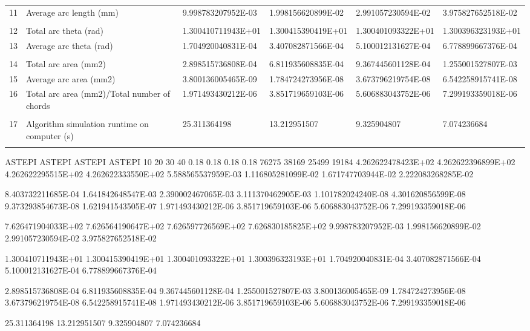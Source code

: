 \begin{tabular}{ p{0.5cm} p{8.0cm} p{4.00cm} p{4.0cm} p{4.00cm} p{4.0cm}}
11	& Average arc length (mm)	                           & 9.998783207952E-03	& 1.998156620899E-02   & 2.991057230594E-02	& 3.975827652518E-02 \\
	&                                                      &                    &                      &                    & \\
12	& Total arc theta (rad)	                               & 1.300410711943E+01	& 1.300415390419E+01   & 1.300401093322E+01	& 1.300396323193E+01 \\
13	& Average arc theta (rad)	                           & 1.704920040831E-04	& 3.407082871566E-04   & 5.100012131627E-04	& 6.778899667376E-04 \\
	&                                                      &                    &                      &                    & \\
14	& Total arc area (mm2)	                               & 2.898515736808E-04	& 6.811935608835E-04   & 9.367445601128E-04	& 1.255001527807E-03 \\
15	& Average arc area (mm2)	                           & 3.800136005465E-09	& 1.784724273956E-08   & 3.673796219754E-08	& 6.542258915741E-08 \\
16	& Total arc area (mm2)/Total number of chords	       & 1.971493430212E-06	& 3.851719659103E-06   & 5.606883043752E-06	& 7.299193359018E-06 \\
	&                                                      &                    &                      &                    & \\
17	& Algorithm simulation runtime on computer (s)         & 25.311364198	    & 13.212951507	       & 9.325904807	    & 7.074236684 \\
	&                                                      &                    &                      &                    & 
\end{tabular}

ASTEPI	ASTEPI	ASTEPI	ASTEPI
10	20	30	40
0.18	0.18	0.18	0.18
76275	38169	25499	19184
4.262622478423E+02	4.262622396899E+02	4.262622295515E+02	4.262622333550E+02
5.588565537959E-03	1.116805281099E-02	1.671747703944E-02	2.222083268285E-02

8.403732211685E-04	1.641842648547E-03	2.390002467065E-03	3.111370462905E-03
1.101782024240E-08	4.301620856599E-08	9.373293854673E-08	1.621941543505E-07
1.971493430212E-06	3.851719659103E-06	5.606883043752E-06	7.299193359018E-06

7.626471904033E+02	7.626564190647E+02	7.626597726569E+02	7.626830185825E+02
9.998783207952E-03	1.998156620899E-02	2.991057230594E-02	3.975827652518E-02

1.300410711943E+01	1.300415390419E+01	1.300401093322E+01	1.300396323193E+01
1.704920040831E-04	3.407082871566E-04	5.100012131627E-04	6.778899667376E-04

2.898515736808E-04	6.811935608835E-04	9.367445601128E-04	1.255001527807E-03
3.800136005465E-09	1.784724273956E-08	3.673796219754E-08	6.542258915741E-08
1.971493430212E-06	3.851719659103E-06	5.606883043752E-06	7.299193359018E-06

25.311364198	13.212951507	9.325904807	7.074236684

